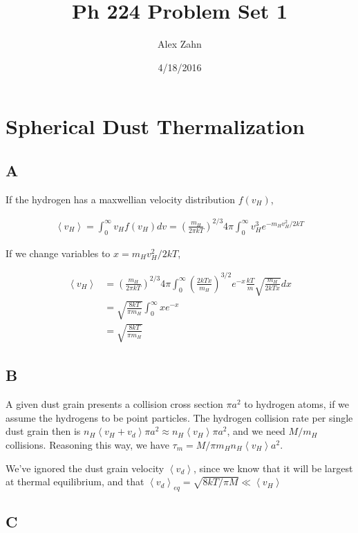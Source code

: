 \documentclass[12pt]{article}
\title{Ph 224 Problem Set 1}
\author{Alex Zahn}
\date{4/18/2016}
\newcommand{\av}[1]{\left\langle #1 \right\rangle}
\begin{document}
\maketitle

\section{Spherical Dust Thermalization}

\subsection*{A}

If the hydrogen has a maxwellian velocity distribution \(f(v_H)\),

\begin{align*}
\av{v_H}=\int_0^\infty v_Hf(v_H)dv= \left( \frac{m_H}{2\pi kT}\right)^{2/3}4\pi\int_0^\infty v_H^3 e^{-m_Hv_H^2/2kT}
\end{align*}

If we change variables to \(x=m_Hv_H^2/2kT\),

\begin{align*}
\av{v_H} &= \left( \frac{m_H}{2\pi kT}\right)^{2/3}4\pi\int_0^\infty \left(\frac{2kTx}{m_H}\right)^{3/2}e^{-x}\frac{kT}{m}\sqrt{\frac{m_H}{2kTx}}dx \\[12pt]
&= \sqrt{\frac{8kT}{\pi m_H}}\int_0^\infty xe^{-x}\\[12pt]
&=  \sqrt{\frac{8kT}{\pi m_H}}
\end{align*}

\subsection*{B}

A given dust grain presents a collision cross section \(\pi a^2\) to hydrogen atoms, if we assume the hydrogens to be point particles. The hydrogen collision rate per single dust grain then is \(n_H \av{v_H+v_d}\pi a^2 \approx n_H \av{v_H}\pi a^2\), and we need \(M/m_H\) collisions. Reasoning this way, we have \(\tau_m = M/\pi m_H n_H\av{v_H}a^2\).

We've ignored the dust grain velocity \(\av{v_d}\), since we know that it will be largest at thermal equilibrium, and that \( \av{v_d}_{eq} =  \sqrt{8kT/\pi M} \ll \av{v_H} \)

\subsection*{C}
\end{document}
